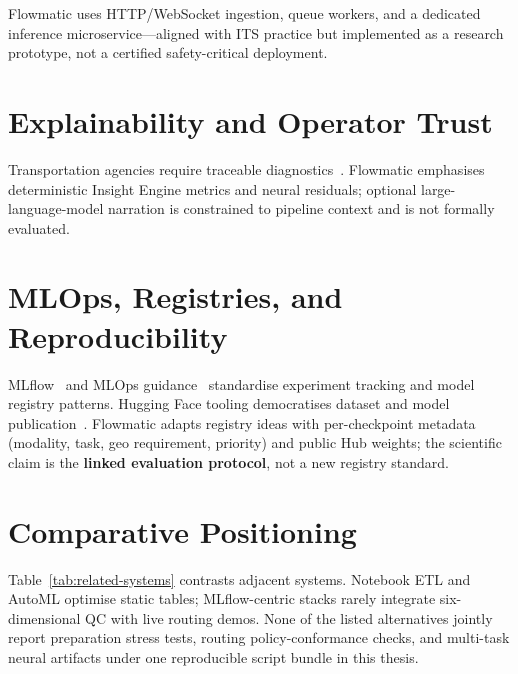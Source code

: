 Flowmatic uses HTTP/WebSocket ingestion, queue workers, and a dedicated inference microservice---aligned with ITS practice but implemented as a research prototype, not a certified safety-critical deployment.

\section{Explainability and Operator Trust}

Transportation agencies require traceable diagnostics~\cite{lundberg2017unified,lundberg2020local,lipton2018mythos,ribeiro2016should}. Flowmatic emphasises deterministic Insight Engine metrics and neural residuals; optional large-language-model narration is constrained to pipeline context and is not formally evaluated.

\section{MLOps, Registries, and Reproducibility}

MLflow~\cite{zaharia2018accelerating} and MLOps guidance~\cite{kreutzberger2022mlops} standardise experiment tracking and model registry patterns. Hugging Face tooling democratises dataset and model publication~\cite{wolf2020transformers}. Flowmatic adapts registry ideas with per-checkpoint metadata (modality, task, geo requirement, priority) and public Hub weights; the scientific claim is the \textbf{linked evaluation protocol}, not a new registry standard.

\section{Comparative Positioning}

Table~\ref{tab:related-systems} contrasts adjacent systems. Notebook ETL and AutoML optimise static tables; MLflow-centric stacks rarely integrate six-dimensional QC with live routing demos. None of the listed alternatives jointly report preparation stress tests, routing policy-conformance checks, and multi-task neural artifacts under one reproducible script bundle in this thesis.


